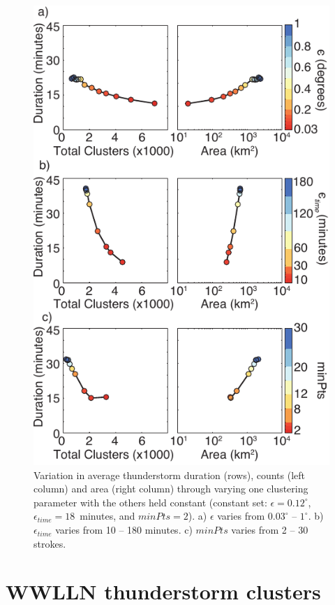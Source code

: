  \begin{figure}[ht!]
    \centering
    \includegraphics[scale=1]{GEC/Figures/parameters.pdf} 
    \caption{Variation in average thunderstorm duration (rows), counts (left column) and area (right column) through varying one clustering parameter with the others held constant (constant set: $\epsilon = 0.12^\circ$, $\epsilon_{time} = 18$~minutes, and $minPts = 2$).
    		 a) $\epsilon$ varies from $0.03^\circ$ -- $1^\circ$.
		 b) $\epsilon_{time}$ varies from 10 -- 180 minutes.
		 c) $minPts$ varies from 2 -- 30 strokes.
		 }
    \label{gec:fig:parameters}
 \end{figure}
 
\section{WWLLN thunderstorm clusters}

